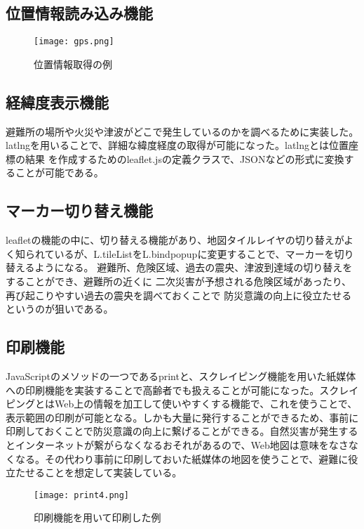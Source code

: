 \documentclass[a4j,twocolumn,dvipdfmx]{jarticle}
\begin{document}
  \subsection{位置情報読み込み機能}
  \begin{center}
   \begin{figure}[htp]
    \texttt{[image: gps.png]}
    \caption{位置情報取得の例}
   \end{figure}
\end{center}
  \subsection{経緯度表示機能}
  避難所の場所や火災や津波がどこで発生しているのかを調べるために実装した。
  latlngを用いることで、詳細な緯度経度の取得が可能になった。latlngとは位置座標の結果
  を作成するためのleaflet.jsの定義クラスで、JSONなどの形式に変換することが可能である。
  \subsection{マーカー切り替え機能}
  leafletの機能の中に、切り替える機能があり、地図タイルレイヤの切り替えがよく知られているが、L.tileListをL.bindpopupに変更することで、マーカーを切り替えるようになる。
  避難所、危険区域、過去の震央、津波到達域の切り替えをすることができ、避難所の近くに
  二次災害が予想される危険区域があったり、再び起こりやすい過去の震央を調べておくことで
  防災意識の向上に役立たせるというのが狙いである。
  \subsection{印刷機能}
  JavaScriptのメソッドの一つであるprintと、スクレイピング機能を用いた紙媒体への印刷機能を実装することで高齢者でも扱えることが可能になった。スクレイピングとはWeb上の情報を加工して使いやすくする機能で、これを使うことで、表示範囲の印刷が可能となる。しかも大量に発行することができるため、事前に印刷しておくことで防災意識の向上に繋げることができる。自然災害が発生するとインターネットが繋がらなくなるおそれがあるので、Web地図は意味をなさなくなる。その代わり事前に印刷しておいた紙媒体の地図を使うことで、避難に役立たせることを想定して実装している。
   \begin{center}
   \begin{figure}[htp]
    \texttt{[image: print4.png]}
    \caption{印刷機能を用いて印刷した例}
   \end{figure}
     \end{center}
\end{document}

